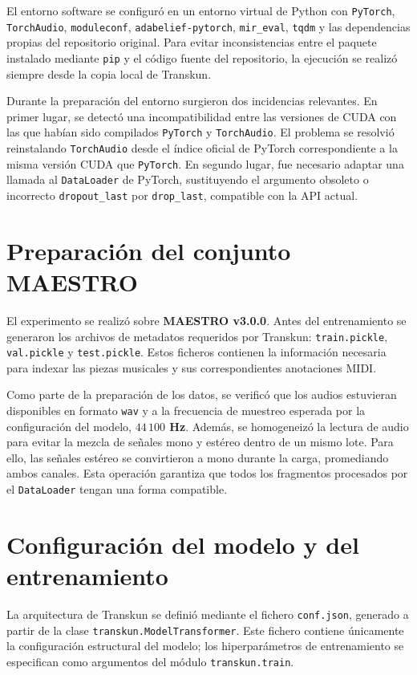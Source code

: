 \documentclass[11pt,spanish,listoffigures,listoftables]{tfgetsinf}
\begin{document}
El entorno software se configuró en un entorno virtual de Python con
\texttt{PyTorch}, \texttt{Torch\-Audio}, \texttt{moduleconf},
\texttt{adabelief-pytorch}, \texttt{mir\_eval}, \texttt{tqdm} y las
dependencias propias del repositorio original. Para evitar inconsistencias entre
el paquete instalado mediante \texttt{pip} y el código fuente del repositorio,
la ejecución se realizó siempre desde la copia local de Transkun.

Durante la preparación del entorno surgieron dos incidencias relevantes. En
primer lugar, se detectó una incompatibilidad entre las versiones de CUDA con
las que habían sido compilados \texttt{PyTorch} y \texttt{TorchAudio}. El
problema se resolvió reinstalando \texttt{TorchAudio} desde el índice oficial
de PyTorch correspondiente a la misma versión CUDA que \texttt{Py\-Torch}. En
segundo lugar, fue necesario adaptar una llamada al \texttt{DataLoader} de
PyTorch, sustituyendo el argumento obsoleto o incorrecto
\texttt{dropout\_last} por \texttt{drop\_last}, compatible con la API actual.

\section{Preparación del conjunto MAESTRO}

El experimento se realizó sobre \textbf{MAESTRO v3.0.0}. Antes del
entrenamiento se generaron los archivos de metadatos requeridos por Transkun:
\texttt{train.pickle}, \texttt{val.pickle} y \texttt{test.pickle}. Estos
ficheros contienen la información necesaria para indexar las piezas musicales y
sus correspondientes anotaciones MIDI.


Como parte de la preparación de los datos, se verificó que los audios estuvieran
disponibles en formato \texttt{wav} y a la frecuencia de muestreo esperada por
la configuración del modelo, \textbf{$44\,100$ Hz}. Además, se homogeneizó la
lectura de audio para evitar la mezcla de señales mono y estéreo dentro de un
mismo lote. Para ello, las señales estéreo se convirtieron a mono durante la
carga, promediando ambos canales. Esta operación garantiza que todos los
fragmentos procesados por el \texttt{DataLoader} tengan una forma compatible.

\section{Configuración del modelo y del entrenamiento}

La arquitectura de Transkun se definió mediante el fichero \texttt{conf.json},
generado a partir de la clase \texttt{transkun.ModelTransformer}. Este fichero
contiene únicamente la configuración estructural del modelo; los
hiperparámetros de entrenamiento se especifican como argumentos del módulo
\texttt{transkun.train}.
\end{document}
